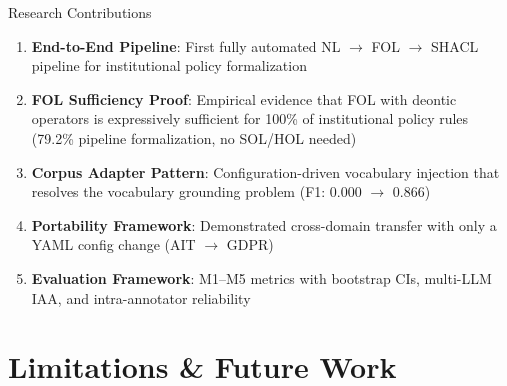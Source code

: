 \documentclass[aspectratio=169, 10pt]{beamer}
\begin{document}
\begin{frame}{Research Contributions}
    \begin{enumerate}
        \item \textbf{End-to-End Pipeline}: First fully automated NL $\rightarrow$ FOL $\rightarrow$ SHACL pipeline for institutional policy formalization
        
        \vspace{0.2cm}
        \item \textbf{FOL Sufficiency Proof}: Empirical evidence that FOL with deontic operators is expressively sufficient for 100\% of institutional policy rules (79.2\% pipeline formalization, no SOL/HOL needed)
        
        \vspace{0.2cm}
        \item \textbf{Corpus Adapter Pattern}: Configuration-driven vocabulary injection that resolves the vocabulary grounding problem (F1: 0.000 $\rightarrow$ 0.866)
        
        \vspace{0.2cm}
        \item \textbf{Portability Framework}: Demonstrated cross-domain transfer with only a YAML config change (AIT $\rightarrow$ GDPR)
        
        \vspace{0.2cm}
        \item \textbf{Evaluation Framework}: M1--M5 metrics with bootstrap CIs, multi-LLM IAA, and intra-annotator reliability
    \end{enumerate}
\end{frame}

\section{Limitations \& Future Work}
\end{document}
